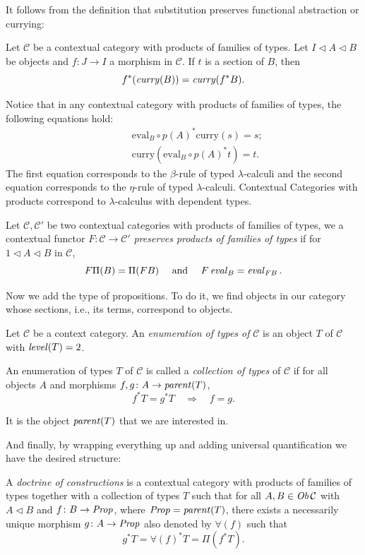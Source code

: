 It follows from the definition that substitution preserves functional abstraction or currying:
\begin{lemma}
    Let $\mathcal{C}$ be a contextual category with products of families of types.
    Let $I \lhd A \lhd B$ be objects and $f \colon J \to I$ a morphism in $\mathcal{C}$.
    If $t$ is a section of $B$, then 
    \[
        f^*(\operatorname{\mathit{curry}}(B)) = \operatorname{\mathit{curry}}(f^*B).
    \]
\end{lemma}

Notice that in any contextual category with products of families of types, the following equations hold:
\begin{align*}
    \qquad & \mathrm{eval}_B \circ p(A)^*\mathrm{curry}(s) = s; \tag{$\beta$} \\[1em]
    \qquad & \mathrm{curry}(\mathrm{eval}_B \circ p(A)^*t) = t. \tag{$\eta$}
\end{align*}
The first equation corresponds to the $\beta$-rule of typed $\lambda$-calculi 
and the second equation corresponds to the $\eta$-rule of typed $\lambda$-calculi.
Contextual Categories with products correspond to $\lambda$-calculus with dependent types.

\begin{definition}
    Let $\mathcal{C}, \mathcal{C}'$ be two contextual categories with products of families of types,
    we a contextual functor $F \colon \mathcal{C} \to \mathcal{C}'$ \textit{preserves products of families
    of types} if for $1 \lhd A \lhd B$ in $\mathcal{C}$, \[
        F\Pi(B) = \Pi(F B) \quad \text{ and } \quad F \operatorname{\mathit{eval}}_B = \operatorname{\mathit{eval}}_{F B}.
    \]
\end{definition}

Now we add the type of propositions. To do it, we find objects in our category whose sections, 
i.e., its terms, correspond to objects.
\begin{definition}
    Let $\mathcal{C}$ be a context category. An \textit{enumeration of types of} $\mathcal{C}$
    is an object $T$ of $\mathcal{C}$ with $\operatorname{\mathit{level}}(T)=2$.

    An enumeration of types $T$ of $\mathcal{C}$ is called a \textit{collection of types} of $\mathcal{C}$
    if for all objects $A$ and morphisms $f, g \colon A \to \operatorname{\mathit{parent}}(T)$,
    \[
        f^*T = g^*T \quad \Longrightarrow \quad f = g.
    \]
\end{definition}
It is the object $\operatorname{\mathit{parent}}(T)$ that we are interested in.

And finally, by wrapping everything up and adding universal quantification we have the desired structure:
\begin{definition}
    A \textit{doctrine of constructions} is a contextual category with products of families of types
    together with a collection of types $T$ such that for all $A, B \in \operatorname{\mathit{Ob}} \mathcal{C}$ with 
    $A \lhd B$ and $f \colon B \to \operatorname{\mathit{Prop}}$, where $\operatorname{\mathit{Prop}} = \operatorname{\mathit{parent}} (T)$, 
    there exists a necessarily unique morphism $g \colon A \to \operatorname{\mathit{Prop}}$ also denoted by $\forall(f)$
    such that
    \[
        g^*T = \forall(f)^*T = \Pi(f^*T).
    \]
\end{definition}

